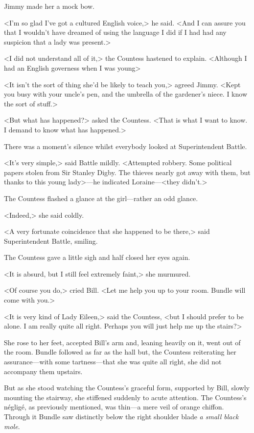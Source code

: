 Jimmy made her a mock bow.

<I'm so glad I've got a cultured English voice,> he said. <And I can assure you that I wouldn't have dreamed of using the language I did if I had had any suspicion that a lady was present.>

<I did not understand all of it,> the Countess hastened to explain. <Although I had an English governess when I was young\longdash>

<It isn't the sort of thing she'd be likely to teach you,> agreed Jimmy. <Kept you busy with your uncle's pen, and the umbrella of the gardener's niece. I know the sort of stuff.>

<But what has happened?> asked the Countess. <That is what I want to know. I demand to know what has happened.>

There was a moment's silence whilst everybody looked at Superintendent Battle.

<It's very simple,> said Battle mildly. <Attempted robbery. Some political papers stolen from Sir Stanley Digby. The thieves nearly got away with them, but thanks to this young lady>—he indicated Loraine—<they didn't.>

The Countess flashed a glance at the girl—rather an odd glance.

<Indeed,> she said coldly.

<A very fortunate coincidence that she happened to be there,> said Superintendent Battle, smiling.

The Countess gave a little sigh and half closed her eyes again.

<It is absurd, but I still feel extremely faint,> she murmured.

<Of course you do,> cried Bill. <Let me help you up to your room. Bundle will come with you.>

<It is very kind of Lady Eileen,> said the Countess, <but I should prefer to be alone. I am really quite all right. Perhaps you will just help me up the stairs?>

She rose to her feet, accepted Bill's arm and, leaning heavily on it, went out of the room. Bundle followed as far as the hall but, the Countess reiterating her assurance—with some tartness—that she was quite all right, she did not accompany them upstairs.

But as she stood watching the Countess's graceful form, supported by Bill, slowly mounting the stairway, she stiffened suddenly to acute attention. The Countess's négligé, as previously mentioned, was thin—a mere veil of orange chiffon. Through it Bundle saw distinctly below the right shoulder blade \emph{a small black mole}.

